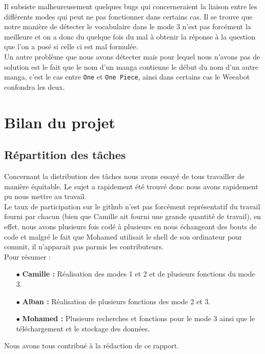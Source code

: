 \documentclass[paper=a4, fontsize=11pt]{article}
\begin{document}
Il subsiste malheureusement quelques bugs qui concerneraient la liaison entre les différents modes qui peut ne pas fonctionner dans certains cas. Il se trouve que notre manière de détecter le vocabulaire dans le mode 3 n'est pas forcément la meilleure et on a donc du quelque fois du mal à obtenir la réponse à la question que l'on a posé si celle ci est mal formulée.\\ 
Un autre problème que nous avons détecter mais pour lequel nous n'avons pas de solution est le fait que le nom d'un manga contienne le début du nom d'un autre manga, c'est le cas entre \texttt{One} et \texttt{One Piece}, ainsi dans certains cas le Weeabot confondra les deux.\\

\section{Bilan du projet}

\subsection{Répartition des tâches}
Concernant la distribution des tâches nous avons essayé de tous travailler de manière équitable. Le sujet a rapidement été trouvé donc nous avons rapidement pu nous mettre au travail.\\
Le taux de participation sur le github n'est pas forcément représentatif du travail fourni par chacun (bien que Camille ait fourni une grande quantité de travail), en effet, nous avons plusieurs fois codé à plusieurs en nous échangeant des bouts de code et malgré le fait que Mohamed utilisait le shell de son ordinateur pour commit, il n'apparait pas parmis les contributeurs.\\

Pour résumer : \\

\begin{itemize}
\item[$\bullet$] \textbf{Camille :} Réalisation des modes 1 et 2 et de plusieurs fonctions du mode 3.\\
\item[$\bullet$] \textbf{Alban :} Réalisation de plusieurs fonctions des mode 2 et 3.\\
\item[$\bullet$] \textbf{Mohamed :} Plusieurs recherches et fonctions pour le mode 3 ainsi que le téléchargement et le stockage des données.\\
\end{itemize}
Nous avons tous contribué à la rédaction de ce rapport.\\
\end{document}
